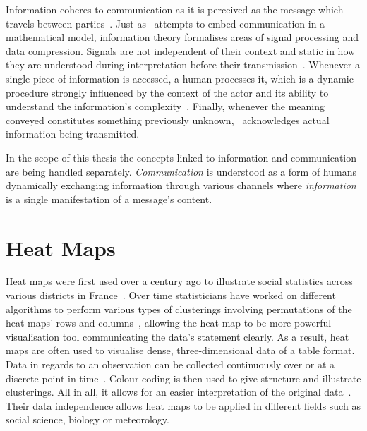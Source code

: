 Information coheres to communication as it is perceived as the message which travels between parties~\citep{floridiinformationintro}. Just as~\citet{savage2011informationtheory} attempts to embed communication in a mathematical model, information theory formalises areas of signal processing and data compression. Signals are not independent of their context and static in how they are understood during interpretation before their transmission~\citep{vigo2011representionalinformation}. Whenever a single piece of information is accessed, a human processes it, which is a dynamic procedure strongly influenced by the context of the actor and its ability to understand the information's complexity~\citep{vigo2011representionalinformation}. Finally, whenever the meaning conveyed constitutes something previously unknown,~\citet{gleick2012theinformation} acknowledges actual information being transmitted.

In the scope of this thesis the concepts linked to information and communication are being handled separately. \textit{Communication} is understood as a form of humans dynamically exchanging information through various channels where \textit{information} is a single manifestation of a message's content.

\section{Heat Maps}

Heat maps were first used over a century ago to illustrate social statistics across various districts in France~\citep{friendly09thehistory}. 
Over time statisticians have worked on different algorithms to perform various types of clusterings involving permutations of the heat maps' rows and columns~\citep{friendly09thehistory}, allowing the heat map to be more powerful visualisation tool communicating the data's statement clearly.
As a result, heat maps are often used to visualise dense, three-dimensional data of a table format. Data in regards to an observation can be collected continuously over or at a discrete point in time~\citep{gehlensborg2012heatmaps}.
Colour coding is then used to give structure and illustrate clusterings. All in all, it allows for an easier interpretation of the original data~\citep{gehlensborg2012heatmaps}. Their data independence allows heat maps to be applied in different fields such as social science, biology or meteorology.

